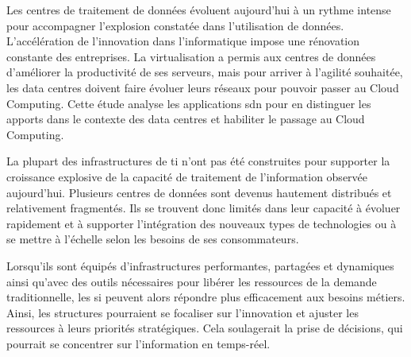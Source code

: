 


Les centres de traitement de données évoluent aujourd'hui à un rythme intense pour accompagner l'explosion constatée dans l'utilisation de données. L'accélération de l'innovation dans l'informatique impose une rénovation constante des entreprises. La virtualisation a permis aux centres de données d'améliorer la productivité de ses serveurs, mais pour arriver à l'agilité souhaitée, les data centres doivent faire évoluer leurs réseaux pour pouvoir passer au Cloud Computing. Cette étude analyse les applications \gls{sdn} pour en distinguer les apports dans le contexte des data centres et habiliter le passage au Cloud Computing.

\par 
La plupart des infrastructures de \gls{ti} n'ont pas été construites pour supporter la croissance explosive de la capacité de traitement de l'information observée aujourd'hui. Plusieurs centres de données sont devenus hautement distribués et relativement fragmentés. Ils se trouvent donc limités dans leur capacité à évoluer rapidement et à supporter l'intégration des nouveaux types de technologies ou à se mettre à l'échelle selon les besoins de ses consommateurs.

\par 
Lorsqu'ils sont équipés d'infrastructures performantes, partagées et dynamiques ainsi qu'avec des outils nécessaires pour libérer les ressources de la demande traditionnelle, les \gls{si} peuvent alors répondre plus efficacement aux besoins métiers. Ainsi, les structures pourraient se focaliser sur l'innovation et ajuster les ressources à leurs priorités stratégiques. Cela soulagerait la prise de décisions, qui pourrait se concentrer sur l'information en temps-réel.


